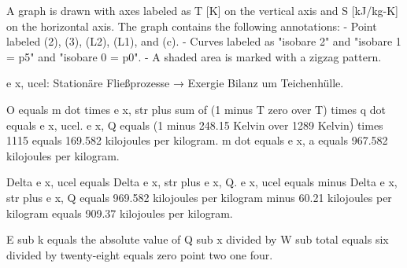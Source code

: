 A graph is drawn with axes labeled as T [K] on the vertical axis and S [kJ/kg-K] on the horizontal axis. The graph contains the following annotations:
- Point labeled (2), (3), (L2), (L1), and (c).
- Curves labeled as "isobare 2" and "isobare 1 = p5" and "isobare 0 = p0".
- A shaded area is marked with a zigzag pattern.

e x, ucel: Stationäre Fließprozesse → Exergie Bilanz um Teichenhülle.

O equals m dot times e x, str plus sum of (1 minus T zero over T) times q dot equals e x, ucel. e x, Q equals (1 minus 248.15 Kelvin over 1289 Kelvin) times 1115 equals 169.582 kilojoules per kilogram. m dot equals e x, a equals 967.582 kilojoules per kilogram.

Delta e x, ucel equals Delta e x, str plus e x, Q. e x, ucel equals minus Delta e x, str plus e x, Q equals 969.582 kilojoules per kilogram minus 60.21 kilojoules per kilogram equals 909.37 kilojoules per kilogram.

E sub k equals the absolute value of Q sub x divided by W sub total equals six divided by twenty-eight equals zero point two one four.